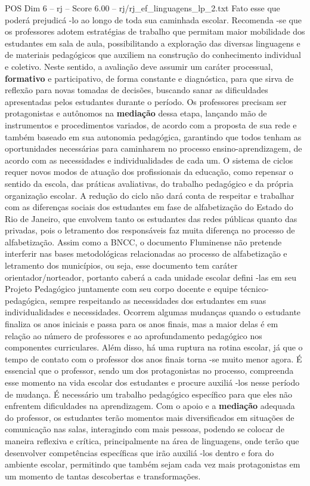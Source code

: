 \begin{textsample}{POS Dim 6 – rj – Score 6.00 – rj/rj\_ef\_linguagens\_lp\_2.txt}
Fato esse que poderá prejudicá -lo ao longo de toda sua caminhada escolar.
Recomenda -se que os professores adotem estratégias de trabalho que permitam maior mobilidade dos estudantes em sala de aula, possibilitando a exploração das diversas linguagens e de materiais pedagógicos que auxiliem na construção do conhecimento individual e coletivo.
Neste sentido, a avaliação deve assumir um caráter processual, \textbf{formativo} e participativo, de forma constante e diagnóstica, para que sirva de reflexão para novas tomadas de decisões, buscando sanar as dificuldades apresentadas pelos estudantes durante o período.
Os professores precisam ser protagonistas e autônomos na \textbf{mediação} dessa etapa, lançando mão de instrumentos e procedimentos variados, de acordo com a proposta de sua rede e também baseado em sua autonomia pedagógica, garantindo que todos tenham as oportunidades necessárias para caminharem no processo ensino-aprendizagem, de acordo com as necessidades e individualidades de cada um.
O sistema de ciclos requer novos modos de atuação dos profissionais da educação, como repensar o sentido da escola, das práticas avaliativas, do trabalho pedagógico e da própria organização escolar.
A redução do ciclo não dará conta de respeitar e trabalhar com as diferenças sociais dos estudantes em fase de alfabetização do Estado do Rio de Janeiro, que envolvem tanto os estudantes das redes públicas quanto das privadas, pois o letramento dos responsáveis faz muita diferença no processo de alfabetização.
Assim como a BNCC, o documento Fluminense não pretende interferir nas bases metodológicas relacionadas ao processo de alfabetização e letramento dos municípios, ou seja, esse documento tem caráter orientador/norteador, portanto caberá a cada unidade escolar defini -las em seu Projeto Pedagógico juntamente com seu corpo docente e equipe técnico-pedagógica, sempre respeitando as necessidades dos estudantes em suas individualidades e necessidades.
Ocorrem algumas mudanças quando o estudante finaliza os anos iniciais e passa para os anos finais, mas a maior delas é em relação ao número de professores e ao aprofundamento pedagógico nos componentes curriculares.
Além disso, há uma ruptura na rotina escolar, já que o tempo de contato com o professor dos anos finais torna -se muito menor agora.
É essencial que o professor, sendo um dos protagonistas no processo, compreenda esse momento na vida escolar dos estudantes e procure auxiliá -los nesse período de mudança.
É necessário um trabalho pedagógico específico para que eles não enfrentem dificuldades na aprendizagem.
Com o apoio e a \textbf{mediação} adequada do professor, os estudantes terão momentos mais diversificados em situações de comunicação nas salas, interagindo com mais pessoas, podendo se colocar de maneira reflexiva e crítica, principalmente na área de linguagens, onde terão que desenvolver competências específicas que irão auxiliá -los dentro e fora do ambiente escolar, permitindo que também sejam cada vez mais protagonistas em um momento de tantas descobertas e transformações.

\end{textsample}
